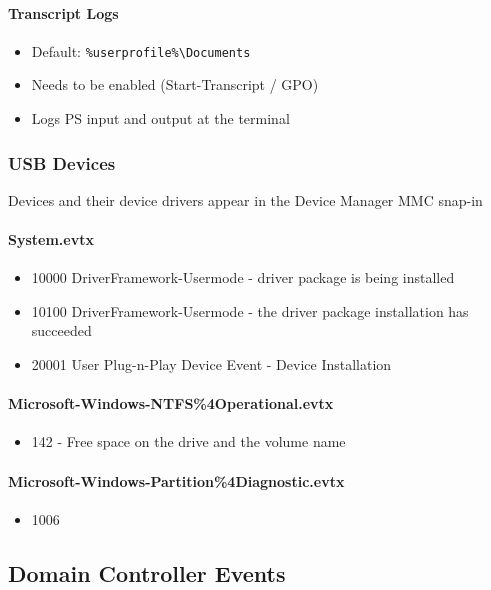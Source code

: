 \paragraph*{Transcript Logs}
\begin{itemize}
    \item Default: \verb|%userprofile%\Documents|
    \item Needs to be enabled (Start-Transcript / GPO)
    \item Logs PS input and output at the terminal
\end{itemize}

\subsubsection*{USB Devices}
Devices and their device drivers appear in the Device Manager MMC snap-in

\paragraph*{System.evtx}
\begin{itemize}
    \item 10000 DriverFramework-Usermode - driver package is being installed
    \item 10100 DriverFramework-Usermode - the driver package installation has succeeded
    \item 20001 User Plug-n-Play Device Event - Device Installation
\end{itemize}

\paragraph*{Microsoft-Windows-NTFS\%4Operational.evtx}
\begin{itemize}
    \item 142 - Free space on the drive and the volume name
\end{itemize}

\paragraph*{Microsoft-Windows-Partition\%4Diagnostic.evtx}
\begin{itemize}
    \item 1006
\end{itemize}

\subsection{Domain Controller Events}
